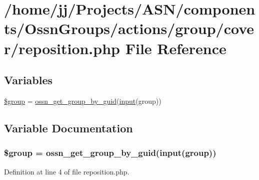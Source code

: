 \hypertarget{_ossn_groups_2actions_2group_2cover_2reposition_8php}{}\section{/home/jj/\+Projects/\+A\+S\+N/components/\+Ossn\+Groups/actions/group/cover/reposition.php File Reference}
\label{_ossn_groups_2actions_2group_2cover_2reposition_8php}
\subsection*{Variables}
\begin{DoxyCompactItemize}
\item 
\hyperlink{_ossn_groups_2actions_2group_2cover_2reposition_8php_ad530a85733b0ec1dc321859fd8faa0dc}{\$group} = \hyperlink{libraries_2groups_8php_a134232596460947e7923a5ec7b255375}{ossn\+\_\+get\+\_\+group\+\_\+by\+\_\+guid}(\hyperlink{ossn_8lib_8input_8php_a64ebee98b041c4f75f71ed3cd73cc8ed}{input}(\textquotesingle{}group\textquotesingle{}))
\end{DoxyCompactItemize}


\subsection{Variable Documentation}
\subsubsection[{\texorpdfstring{\$group}{$group}}]{\setlength{\rightskip}{0pt plus 5cm}\$group = {\bf ossn\+\_\+get\+\_\+group\+\_\+by\+\_\+guid}({\bf input}(\textquotesingle{}group\textquotesingle{}))}\hypertarget{_ossn_groups_2actions_2group_2cover_2reposition_8php_ad530a85733b0ec1dc321859fd8faa0dc}{}\label{_ossn_groups_2actions_2group_2cover_2reposition_8php_ad530a85733b0ec1dc321859fd8faa0dc}


Definition at line 4 of file reposition.\+php.


